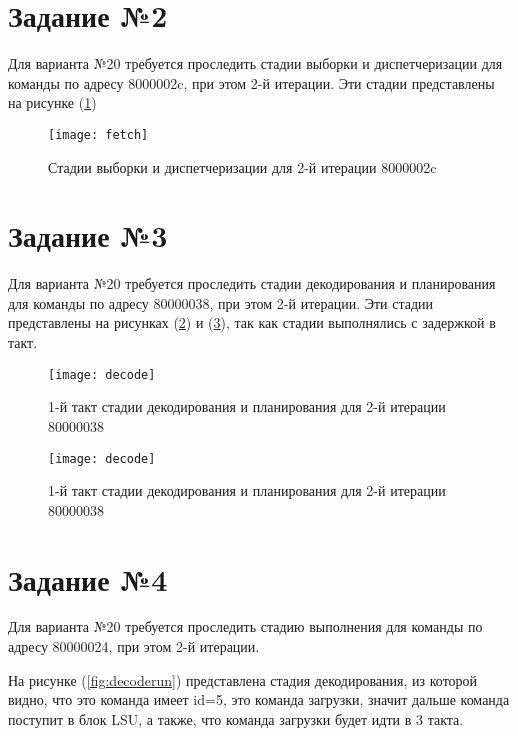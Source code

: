 \clearpage

\section{Задание №2}

Для варианта №20 требуется проследить стадии выборки и диспетчеризации для команды по адресу 8000002c, при этом 2-й итерации.
Эти стадии представлены на рисунке (\ref{fig:fetch})

\begin{figure}[h]
	\centering
	\texttt{[image: fetch]}
	\caption{Стадии выборки и диспетчеризации для 2-й итерации 8000002c}
	\label{fig:fetch}
\end{figure}

\clearpage

\section{Задание №3}

Для варианта №20 требуется проследить стадии декодирования и планирования для команды по адресу 80000038, при этом 2-й итерации.
Эти стадии представлены на рисунках (\ref{fig:decode}) и (\ref{fig:decode2}), так как стадии выполнялись с задержкой в такт.

\begin{figure}[h]
	\centering
	\texttt{[image: decode]}
	\caption{1-й такт стадии декодирования и планирования для 2-й итерации 80000038}
	\label{fig:decode}
\end{figure}


\begin{figure}[h]
	\centering
	\texttt{[image: decode]}
	\caption{1-й такт стадии декодирования и планирования для 2-й итерации 80000038}
	\label{fig:decode2}
\end{figure}

\clearpage

\section{Задание №4}
Для варианта №20 требуется проследить стадию выполнения для команды по адресу 80000024, при этом 2-й итерации.

На рисунке (\ref{fig:decoderun}) представлена стадия декодирования,  из которой видно, что это команда имеет id=5, это команда загрузки, значит дальше команда поступит в блок LSU, а также, что команда загрузки будет идти в 3 такта.

